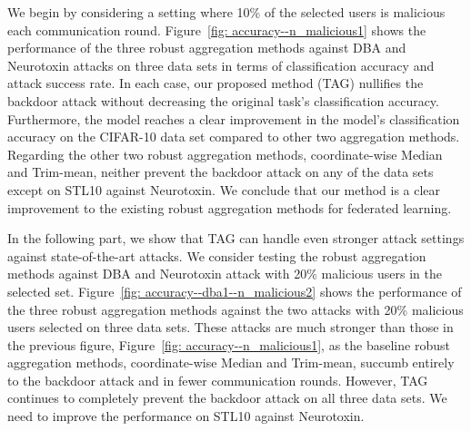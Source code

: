 \documentclass{article} %
\begin{document}
We begin by considering a setting where 10\% of the selected users is malicious each communication round. Figure~\ref{fig: accuracy--n_malicious1} shows the performance of the three robust aggregation methods against DBA and Neurotoxin attacks on three data sets in terms of classification accuracy and attack success rate.
In each case, our proposed method (TAG) nullifies the backdoor attack without decreasing the original task's classification accuracy. Furthermore, the model reaches a clear improvement in the model's classification accuracy on the CIFAR-10 data set compared to other two aggregation methods. Regarding the other two robust aggregation methods, coordinate-wise Median and Trim-mean, neither prevent the backdoor attack on any of the data sets except on STL10 against Neurotoxin. We conclude that our method is a clear improvement to the existing robust aggregation methods for federated learning. 




In the following part, we show that TAG can handle even stronger attack settings against state-of-the-art attacks. We consider testing the robust aggregation methods against DBA and Neurotoxin attack with 20\% malicious users in the selected set. 
Figure~\ref{fig: accuracy--dba1--n_malicious2} shows the performance of the three robust aggregation methods against the two attacks with 20\% malicious users selected on three data sets.
These attacks are much stronger than those in the previous figure, Figure~\ref{fig: accuracy--n_malicious1}, as the baseline robust aggregation methods, coordinate-wise Median and Trim-mean, succumb entirely to the backdoor attack and in fewer communication rounds. However, TAG continues to completely prevent the backdoor attack on all three data sets. {\color{red} We need to improve the performance on STL10 against Neurotoxin.}
\end{document}

